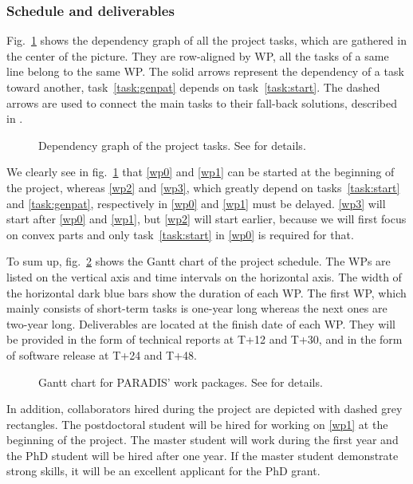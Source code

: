     

\subsubsection{Schedule and deliverables}
\label{sec:schedule}

Fig.~\ref{fig:tasks} shows the dependency graph of all the project tasks, which
are gathered in the center of the picture. They are row-aligned by WP,
\ie all the tasks of a same line belong to the same WP. 
The solid arrows represent the dependency of a task toward another,
\eg task~\ref{task:genpat} depends on task~\ref{task:start}. 
The dashed arrows are used to connect the main tasks to their fall-back solutions,
described in . 

\begin{figure}[htbp]
  \centering
  
  \caption{Dependency graph of the project tasks. See  for details.}
  \label{fig:tasks}
\end{figure}

We clearly see in fig.~\ref{fig:tasks} that \ref{wp0} and \ref{wp1} can be started
at the beginning of the project, whereas \ref{wp2} and \ref{wp3}, which greatly depend
on tasks~\ref{task:start} and \ref{task:genpat}, respectively in \ref{wp0} and \ref{wp1}
must be delayed. \ref{wp3} will start after \ref{wp0} and \ref{wp1}, but \ref{wp2} will
start earlier, because we will first focus on convex parts and only task~\ref{task:start}
in \ref{wp0} is required for that.

To sum up, fig.~\ref{fig:gantt} shows the Gantt chart of the project schedule.
The WPs are listed on the vertical axis and time intervals on the horizontal axis.
The width of the horizontal dark blue bars show the duration of each WP. The first WP,
which mainly consists of short-term tasks is one-year long whereas the next ones are
two-year long. Deliverables are located at the finish date of each WP. They will be
provided in the form of technical reports at T+12 and T+30, and in the form of software
release at T+24 and T+48.

\begin{figure}[htbp]
  \centering
  
  \caption{Gantt chart for PARADIS' work packages. See  for details.}
  \label{fig:gantt}
\end{figure}

In addition, collaborators hired during the project are depicted with dashed grey rectangles.
The postdoctoral student will be hired for working on \ref{wp1} at the beginning of the project.
The master student will work during the first year and the PhD student will be hired
after one year. If the master student demonstrate strong skills, it will be an excellent applicant
for the PhD grant.

